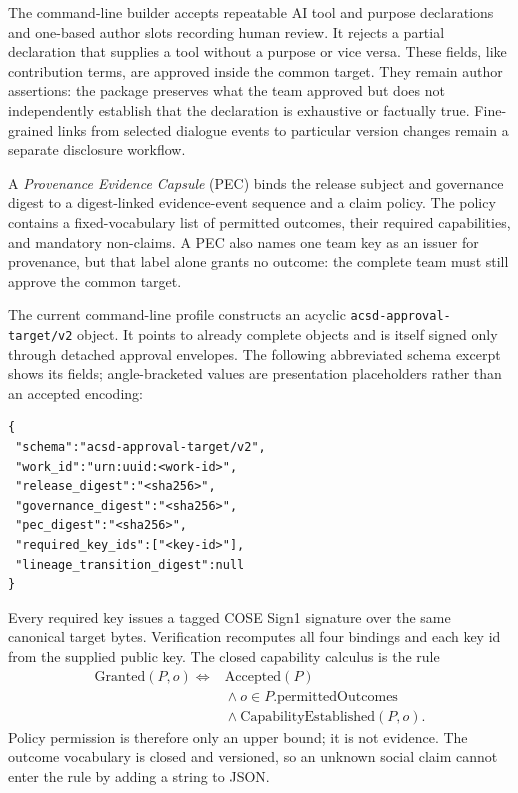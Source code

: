 \documentclass[acmsmall,screen,review,nonacm]{acmart}
\begin{document}
The command-line builder accepts repeatable AI tool and purpose declarations
and one-based author slots recording human review. It rejects a partial
declaration that supplies a tool without a purpose or vice versa. These fields,
like contribution terms, are approved inside the common target. They remain
author assertions: the package preserves what the team approved but does not
independently establish that the declaration is exhaustive or factually true.
Fine-grained links from selected dialogue events to particular version changes
remain a separate disclosure workflow.

A \emph{Provenance Evidence Capsule} (PEC) binds the release subject and
governance digest to a digest-linked evidence-event sequence and a claim
policy. The policy contains a fixed-vocabulary list of permitted outcomes,
their required capabilities, and mandatory non-claims. A PEC also names one
team key as an issuer for provenance, but that label alone grants no outcome:
the complete team must still approve the common target.

The current command-line profile constructs an acyclic
\texttt{acsd-approval-target/v2} object. It points to already complete objects
and is itself signed only through detached approval envelopes. The following
abbreviated schema excerpt shows its fields; angle-bracketed values are
presentation placeholders rather than an accepted encoding:

\begingroup\scriptsize
\begin{verbatim}
{
 "schema":"acsd-approval-target/v2",
 "work_id":"urn:uuid:<work-id>",
 "release_digest":"<sha256>",
 "governance_digest":"<sha256>",
 "pec_digest":"<sha256>",
 "required_key_ids":["<key-id>"],
 "lineage_transition_digest":null
}
\end{verbatim}
\endgroup

Every required key issues a tagged COSE Sign1 signature over the same
canonical target bytes. Verification recomputes all four bindings and each key
id from the supplied public key. The closed capability calculus is the rule
\[
\begin{aligned}
 \mathrm{Granted}(P,o) \iff{}& \mathrm{Accepted}(P) \\
 &{}\land o\in P.\mathrm{permittedOutcomes} \\
 &{}\land \mathrm{CapabilityEstablished}(P,o).
\end{aligned}
\]
Policy permission is therefore only an upper bound; it is not evidence. The
outcome vocabulary is closed and versioned, so an unknown social claim
cannot enter the rule by adding a string to JSON.
\end{document}
